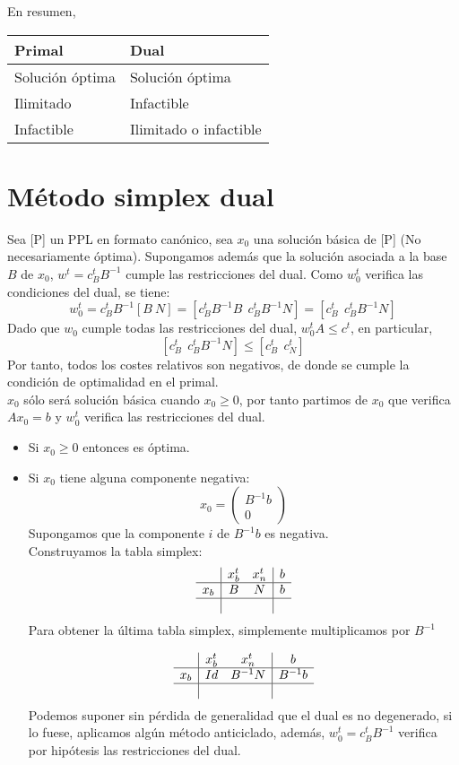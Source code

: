 \documentclass[11pt,fleqn]{book} %
\begin{document}
En resumen,
\begin{center}
  \begin{tabular}{|l|l|}
	\hline
	\textbf{Primal} & \textbf{Dual} \\ \hline
	Solución óptima & Solución óptima \\ \hline
	Ilimitado & Infactible \\ \hline
	Infactible & Ilimitado o infactible \\ \hline
  \end{tabular}
\end{center}

\section{Método simplex dual}
Sea [P] un PPL en formato canónico, sea $x_0$ una solución básica de [P] (No necesariamente óptima). Supongamos además que la solución asociada a la base $B$ de $x_0$, $w^t = c_B^t B^{-1}$ cumple las restricciones del dual. Como $w_0^t$ verifica las condiciones del dual, se tiene: $$w_0^t= c_B^t B^{-1} [B ~ N]=[c_B^tB^{-1} B ~~ c_B^t B^{-1} N]=[c_B^t ~~ c_B^t B^{-1} N]$$
Dado que $w_0$ cumple todas las restricciones del dual, $w_0^t A \leq c^t$, en particular, 
$$ [c_B^t ~~ c_B^t B^{-1} N] \leq [c_B^t ~~ c_N^t]$$
Por tanto, todos los costes relativos son negativos, de donde  se cumple la condición de optimalidad en el primal. \\
$x_0$ sólo será solución básica cuando $x_0 \geq 0$, por tanto partimos de $x_0$ que verifica $Ax_0 = b$ y $w_0^t$ verifica las restricciones del dual.
\begin{itemize}
\item Si $x_0 \geq 0$ entonces es óptima.
\item Si $x_0$ tiene alguna componente negativa:
  $$x_0 = \left(
  \begin{array}{c}
	B^{-1} b \\
	0
  \end{array}
  \right)$$
  Supongamos que la componente $i$ de $B^{-1} b$ es negativa. \\
  Construyamos la tabla simplex:
  $$
  \begin{array}{c|cc|c}
	& x_b^t & x_n^t  & b\\ \hline
	x_b& B & N  & b \\ \hline
	& & & 
  \end{array}
  $$
  Para obtener la última tabla simplex, simplemente 
  multiplicamos por $B^{-1}$
  
  $$
  \begin{array}{c|cc|c}
	& x_b^t & x_n^t  & b\\ \hline
	x_b& Id & B^{-1} N & B^{-1} b \\ \hline
	& & &
  \end{array}
  $$
  Podemos suponer sin pérdida de generalidad que el dual es no degenerado, si lo fuese, aplicamos algún método anticiclado, además, $w_0^t=c_B^t B^{-1}$ verifica por hipótesis las restricciones del dual.
\end{itemize}
\end{document}
